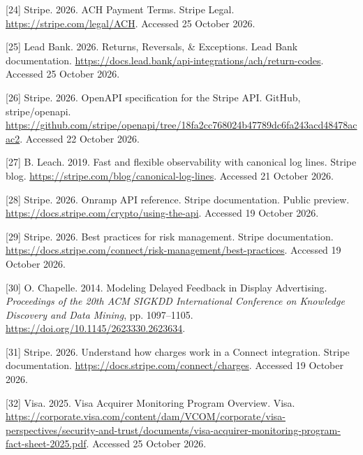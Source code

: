 \documentclass[
  11pt,
]{article}
\newlength{\cslhangindent}
\newlength{\cslentryspacingunit} %
\newenvironment{CSLReferences}[2] %
 {%
  \setlength{\parindent}{0pt}
  \ifodd #1
  \let\oldpar\par
  \def\par{\hangindent=\cslhangindent\oldpar}
  \fi
  \setlength{\parskip}{#2\cslentryspacingunit}
 }%
 {}
\begin{document}
\begin{CSLReferences}{1}{1}
\leavevmode{}%
{[}24{]} Stripe. 2026. ACH Payment Terms. Stripe Legal.
\url{https://stripe.com/legal/ACH}. Accessed 25 October 2026.

\leavevmode{}%
{[}25{]} Lead Bank. 2026. Returns, Reversals, \& Exceptions. Lead Bank
documentation.
\url{https://docs.lead.bank/api-integrations/ach/return-codes}. Accessed
25 October 2026.

\leavevmode{}%
{[}26{]} Stripe. 2026. OpenAPI specification for the Stripe API. GitHub,
stripe/openapi.
\url{https://github.com/stripe/openapi/tree/18fa2cc768024b47789dc6fa243acd48478acac2}.
Accessed 22 October 2026.

\leavevmode{}%
{[}27{]} B. Leach. 2019. Fast and flexible observability with canonical
log lines. Stripe blog.
\url{https://stripe.com/blog/canonical-log-lines}. Accessed 21 October
2026.

\leavevmode{}%
{[}28{]} Stripe. 2026. Onramp API reference. Stripe documentation.
Public preview. \url{https://docs.stripe.com/crypto/using-the-api}.
Accessed 19 October 2026.

\leavevmode{}%
{[}29{]} Stripe. 2026. Best practices for risk management. Stripe
documentation.
\url{https://docs.stripe.com/connect/risk-management/best-practices}.
Accessed 19 October 2026.

\leavevmode{}%
{[}30{]} O. Chapelle. 2014. Modeling Delayed Feedback in Display
Advertising. \emph{Proceedings of the 20th ACM SIGKDD International
Conference on Knowledge Discovery and Data Mining}, pp. 1097--1105.
\url{https://doi.org/10.1145/2623330.2623634}.

\leavevmode{}%
{[}31{]} Stripe. 2026. Understand how charges work in a Connect
integration. Stripe documentation.
\url{https://docs.stripe.com/connect/charges}. Accessed 19 October 2026.

\leavevmode{}%
{[}32{]} Visa. 2025. Visa Acquirer Monitoring Program Overview. Visa.
\url{https://corporate.visa.com/content/dam/VCOM/corporate/visa-perspectives/security-and-trust/documents/visa-acquirer-monitoring-program-fact-sheet-2025.pdf}.
Accessed 25 October 2026.


\end{CSLReferences}
\end{document}
